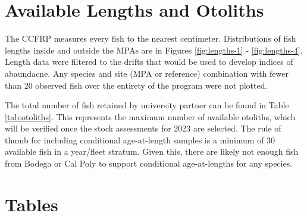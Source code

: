 \documentclass[
]{article}
\begin{document}
\hypertarget{available-lengths-and-otoliths}{%
\section{Available Lengths and Otoliths}\label{available-lengths-and-otoliths}}

The CCFRP measures every fish to the nearest centimeter. Distributions of fish
lengths inside and outside the MPAs are in Figures
\ref{fig:lengths-1} - \ref{fig:lengths-4}. Length data were
filtered to the drifts that would be used to develop indices of abaundacne.
Any species and site (MPA or reference) combination with fewer than 20 observed
fish over the entirety of the program were not plotted.

The total number of fish retained by university partner can be found in Table
\ref{tab:otoliths}. This represents the maximum number of available otoliths,
which will be verified once the stock assessments for 2023 are selected. The
rule of thumb for including conditional age-at-length samples is a minimum of 30
available fish in a year/fleet stratum. Given this, there are likely not enough
fish from Bodega or Cal Poly to support conditional age-at-lengths for any species.

\FloatBarrier
\newpage

\hypertarget{tables}{%
\section{Tables}\label{tables}}

\FloatBarrier
\end{document}
